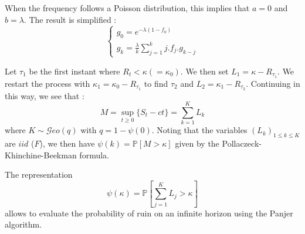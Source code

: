 \begin{f}
	When the frequency follows a Poisson distribution, this implies that {\color{OrangeProfondIRA} \(a=0\) and \(b=\lambda\).}
	The result is simplified :
	\[
\begin{cases}
		g_0= e^{-\lambda (1-f_0)}
	\\
	g_k=\frac{\lambda}{k}\sum_{j=1}^k j . f_j  . g_{k-j}
\end{cases}	
\]
	
\end{f}

\begin{f}
	
	Let \(\tau_1\) be the first instant where \(R_t<\kappa(=\kappa_0)\). We then set \(L_1=\kappa -R_{\tau_1}\).
	We restart the process with \(\kappa_1=\kappa_0-R_{\tau_1}\) to find \(\tau_2\) and \(L_2=\kappa_1 -R_{\tau_2}\).
	Continuing in this way, we see that :
	\[
	M=\sup_{t\geq 0}\{ S_t -ct \} =\sum_{k=1}^{K}L_k
	\]
	where \(K\sim \mathcal{G}eo(q)\) with \(q=1-\psi(0)\).  
	Noting that the variables \(\left( L_k\right)_{1\leq k\leq K}\) are \(iid\) (\(F\)), we then have \(\psi(k)=\mathbb{P}[M>\kappa]\) given by the Pollaczeck-Khinchine-Beekman formula.
	
	
	The representation
	\[
	\psi(\kappa)=\mathbb{P}\left[\sum_{j = 1}^{K}L_j>\kappa \right] 
	\]
	allows to evaluate the probability of ruin on an infinite horizon using the Panjer algorithm.
	
\end{f}





